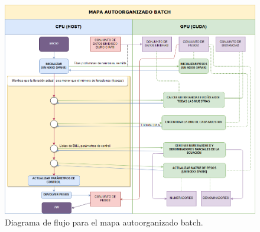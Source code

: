 \begin{figure}[ht]
\centering
\includegraphics[scale=0.35]{imagenes/flujosombatch.png}
\caption{Diagrama de flujo para el mapa autoorganizado batch.}
\end{figure}